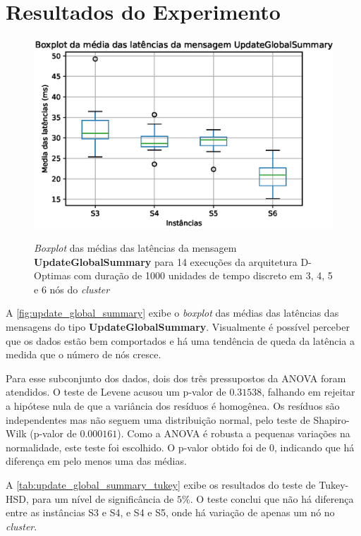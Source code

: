 \section{Resultados do Experimento }
\label{sec:resultado}

\begin{figure}
    \centering
    \caption{\textit{Boxplot} das médias das latências da mensagem \textbf{UpdateGlobalSummary} para 14 execuções da arquitetura D-Optimas com duração de 1000 unidades de tempo discreto em 3, 4, 5 e 6 nós do \textit{cluster} }
    \includegraphics[scale=0.8]{imagens/update_global_summary.eps}
    \label{fig:update_global_summary}
\end{figure}

A \autoref{fig:update_global_summary} exibe o \textit{boxplot} das médias das latências das mensagens do tipo \textbf{UpdateGlobalSummary}. Visualmente é possível perceber que os dados estão bem comportados e há uma tendência de queda da latência a medida que o número de nós cresce. 

Para esse subconjunto dos dados, dois dos três pressupostos da ANOVA foram atendidos. O teste de Levene acusou um p-valor de $0.31538$, falhando em rejeitar a hipótese nula de que a variância dos resíduos é homogênea. Os resíduos são independentes mas não seguem uma distribuição normal, pelo teste de Shapiro-Wilk (p-valor de $0.000161$). Como a ANOVA é robusta a pequenas variações na normalidade, este teste foi escolhido. O p-valor obtido foi de $0$, indicando que há diferença em pelo menos uma das médias. 

A \autoref{tab:update_global_summary_tukey} exibe os resultados do teste de Tukey-HSD, para um nível de significância de $5\%$. O teste conclui que não há diferença entre as instâncias S3 e S4, e S4 e S5, onde há variação de apenas um nó no \textit{cluster}.

